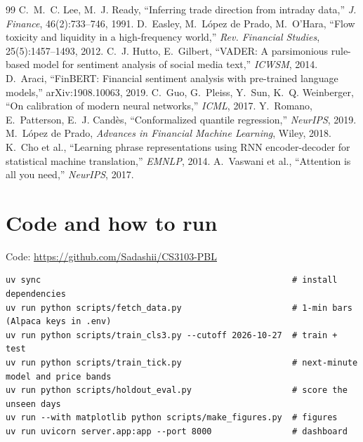 \documentclass[11pt,a4paper]{article}
\begin{document}
\begin{thebibliography}{99}
 C.~M.~C. Lee, M.~J. Ready, ``Inferring trade direction from intraday data,'' \emph{J. Finance}, 46(2):733--746, 1991.
 D.~Easley, M.~L\'opez de Prado, M.~O'Hara, ``Flow toxicity and liquidity in a high-frequency world,'' \emph{Rev. Financial Studies}, 25(5):1457--1493, 2012.
 C.~J. Hutto, E.~Gilbert, ``VADER: A parsimonious rule-based model for sentiment analysis of social media text,'' \emph{ICWSM}, 2014.
 D.~Araci, ``FinBERT: Financial sentiment analysis with pre-trained language models,'' arXiv:1908.10063, 2019.
 C.~Guo, G.~Pleiss, Y.~Sun, K.~Q. Weinberger, ``On calibration of modern neural networks,'' \emph{ICML}, 2017.
 Y.~Romano, E.~Patterson, E.~J. Cand\`es, ``Conformalized quantile regression,'' \emph{NeurIPS}, 2019.
 M.~L\'opez de Prado, \emph{Advances in Financial Machine Learning}, Wiley, 2018.
 K.~Cho et al., ``Learning phrase representations using RNN encoder-decoder for statistical machine translation,'' \emph{EMNLP}, 2014.
 A.~Vaswani et al., ``Attention is all you need,'' \emph{NeurIPS}, 2017.
\end{thebibliography}

\clearpage
\appendix
\section{Code and how to run}
Code: \url{https://github.com/Sadashii/CS3103-PBL}
\begin{small}
\begin{verbatim}
uv sync                                                  # install dependencies
uv run python scripts/fetch_data.py                      # 1-min bars (Alpaca keys in .env)
uv run python scripts/train_cls3.py --cutoff 2026-10-27  # train + test
uv run python scripts/train_tick.py                      # next-minute model and price bands
uv run python scripts/holdout_eval.py                    # score the unseen days
uv run --with matplotlib python scripts/make_figures.py  # figures
uv run uvicorn server.app:app --port 8000                # dashboard
\end{verbatim}
\end{small}
\end{document}
